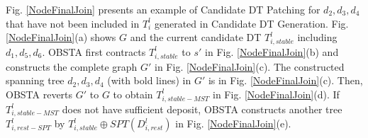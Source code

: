 \documentclass[10pt, conference, letterpaper]{IEEEtran}
\theoremstyle{definition}
\begin{document}
\begin{Example}
Fig. \ref{NodeFinalJoin} presents an example of Candidate DT Patching for $d_2,d_3,d_4$ that have not been included in $T_{i}^l$ generated in Candidate DT Generation. Fig. \ref{NodeFinalJoin}(a) shows $G$ and the current candidate DT $T_{i,stable}^l$ including $d_1,d_5,d_6$. OBSTA first contracts $T_{i,stable}^l$ to $s'$ in Fig. \ref{NodeFinalJoin}(b) and constructs the complete graph $G'$ in Fig. \ref{NodeFinalJoin}(c). The constructed spanning tree $d_2,d_3,d_4$ (with bold lines) in $G'$ is in Fig. \ref{NodeFinalJoin}(c). Then, OBSTA reverts $G'$ to $G$ to obtain $T_{i,stable-MST}^l$ in Fig. \ref{NodeFinalJoin}(d). If $T_{i,stable-MST}^l$ does not have sufficient deposit, OBSTA constructs another tree $T_{i,rest-SPT}^l$ by $T_{i,stable}^{l} \oplus SPT(D_{i,rest}^{l})$ in Fig. \ref{NodeFinalJoin}(e).
\end{Example}





\end{document}
